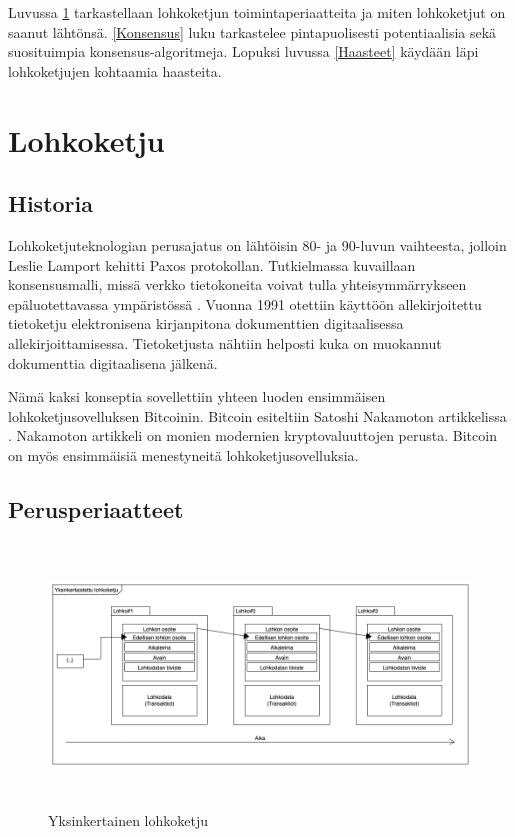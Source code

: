 \documentclass[utf8,bachelor]{gradu3}
\begin{document}
Luvussa \ref{Lohkoketju} tarkastellaan lohkoketjun toimintaperiaatteita ja miten lohkoketjut on saanut lähtönsä.
\ref{Konsensus} luku tarkastelee pintapuolisesti potentiaalisia sekä suosituimpia konsensus-algoritmeja.
Lopuksi luvussa \ref{Haasteet} käydään läpi lohkoketjujen kohtaamia haasteita.



\chapter{Lohkoketju}\label{Lohkoketju}
\section{Historia}

Lohkoketjuteknologian perusajatus on lähtöisin 80- ja 90-luvun vaihteesta, jolloin Leslie Lamport kehitti Paxos protokollan. 
Tutkielmassa kuvaillaan konsensusmalli, missä verkko tietokoneita voivat tulla yhteisymmärrykseen epäluotettavassa ympäristössä \parencite{lamport2019part}. 
Vuonna 1991 otettiin käyttöön allekirjoitettu tietoketju elektronisena kirjanpitona dokumenttien digitaalisessa allekirjoittamisessa. Tietoketjusta nähtiin helposti kuka on muokannut dokumenttia digitaalisena jälkenä.

Nämä kaksi konseptia sovellettiin yhteen luoden ensimmäisen lohkoketjusovelluksen Bitcoinin. Bitcoin esiteltiin Satoshi Nakamoton artikkelissa \parencite{nakamoto2008bitcoin}.
Nakamoton artikkeli on monien modernien kryptovaluuttojen perusta.
Bitcoin on myös ensimmäisiä menestyneitä lohkoketjusovelluksia.


\section{Perusperiaatteet}

\begin{figure}[h]\centering
  \includegraphics[height=7cm,keepaspectratio]{lohkoketjuDiag}
  \caption[Yksinkertainen lohkoketju]{Yksinkertainen lohkoketju}
  \label{fig:Lohkoketju}
\end{figure}
\end{document}
